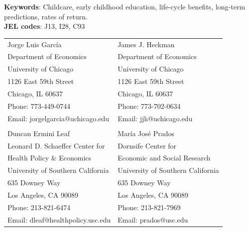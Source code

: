 \noindent \textbf{Keywords}: Childcare, early childhood education, life-cycle benefits, long-term predictions, rates of return. \\
\noindent \textbf{JEL codes}: J13, I28, C93\\


\bigskip
\begin{tabular}{ll}
Jorge Luis Garc\'{i}a                                       & James J. Heckman \\
Department of Economics                                & Department of Economics \\
University of Chicago                                       & University of Chicago \\
1126 East 59th Street                                     & 1126 East 59th Street \\
Chicago, IL 60637                                           & Chicago, IL 60637 \\
Phone: 773-449-0744                                  & Phone: 773-702-0634  \\
Email: jorgelgarcia@uchicago.edu                       & Email: jjh@uchicago.edu \\
                                                                       & \\
Duncan Ermini Leaf                                           & Mar\'{i}a Jos\'{e} Prados \\
Leonard D. Schaeffer Center for            & Dornsife Center for  \\
Health Policy \& Economics                                          & Economic and Social Research \\
University of Southern California                        & University of Southern California \\
635 Downey Way                                             & 635 Downey Way        \\
Los Angeles, CA 90089                                    & Los Angeles, CA 90089 \\
Phone: 213-821-6474                                     & Phone: 213-821-7969 \\
Email: dleaf@healthpolicy.usc.edu                     & Email: prados@usc.edu \\

\end{tabular}

\clearpage

\restoregeometry
\doublespacing
\setcounter{page}{1}

